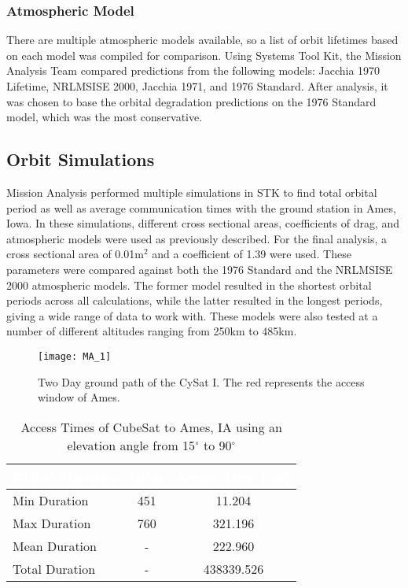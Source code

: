 \documentclass[nocover]            %
{CSLI}                       %
\begin{document}
\subsubsection{Atmospheric Model}
There are multiple atmospheric models available, so a list of orbit lifetimes based on each model was compiled for comparison. Using Systems Tool Kit, the Mission Analysis Team compared predictions from the following models: Jacchia 1970 Lifetime, NRLMSISE 2000, Jacchia 1971, and 1976 Standard. After analysis, it was chosen to base the orbital degradation predictions on the 1976 Standard model, which was the most conservative.
\subsection{Orbit Simulations}
Mission Analysis performed multiple simulations in STK to find total orbital period as well as average communication times with the ground station in Ames, Iowa. In these simulations, different cross sectional areas, coefficients of drag, and atmospheric models were used as previously described. For the final analysis, a cross sectional area of 0.01m$^2$ and a coefficient of 1.39 were used. These parameters were compared against both the 1976 Standard and the NRLMSISE 2000 atmospheric models. The former model resulted in the shortest orbital periods across all calculations, while the latter resulted in the longest periods, giving a wide range of data to work with. These models were also tested at a number of different altitudes ranging from 250km to 485km.

\begin{figure}[H]

    \texttt{[image: MA\_1]}
    \caption{Two Day ground path of the CySat I. The red represents the access window of Ames.}
\end{figure}

\begin{table}[H]
\centering
\caption{Access Times of CubeSat to Ames, IA using an elevation angle from 15$^\circ$ to 90$^\circ$}
\begin{tabular}{| l | c | c |}
\arrayrulecolor{white}
\hline
\rowcolor{gray!80}
\textcolor{white}{\textbf{Global Statistics}} & \textcolor{white}{\textbf{Orbit}} & \textcolor{white}{\textbf{Access Time (sec)}} \\ \hline
\rowcolor{gray!10}
Min Duration & 451 & 11.204\\ \hline
\rowcolor{gray!5}
Max Duration & 760 &  321.196 \\ \hline
\rowcolor{gray!10}
Mean Duration & - & 222.960 \\ \hline
\rowcolor{gray!5}
Total Duration & - & 438339.526 \\ \hline
\end{tabular}
\end{table}
\end{document}
